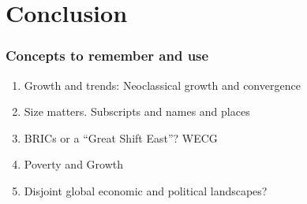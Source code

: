 { %
    \begin{frame}[plain]
     \btVFill
        \hspace{-0.9cm}\noindent{\linespread{0.5}\selectfont
        \textcolor{black}{\tiny
        Source: Dollar and Kraay 2002
        }
        \par
        }
     \end{frame}
}

\section{Conclusion}

\begin{frame}\frametitle{Concepts to remember and use}

\begin{enumerate}
 \item{Growth and trends:  Neoclassical growth and convergence}
 \item{Size matters.  Subscripts and names and places}
 \item{BRICs or a ``Great Shift East''? WECG}
 \item{Poverty and Growth}
 \item{Disjoint global economic and political landscapes?}
\end{enumerate}

\end{frame}
%


\begin{frame}


\end{frame}


%
% 

